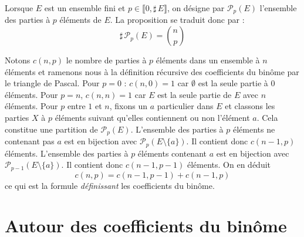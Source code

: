 \begin{rem}
 Lorsque $E$ est un ensemble fini et $p\in\llbracket 0, \sharp\,E\rrbracket$, on désigne par $\mathcal P_p(E)$ l'ensemble des parties à $p$ éléments de $E$. La proposition se traduit donc par :
\begin{displaymath}
 \sharp\,\mathcal P_p(E) = \binom{n}{p}
\end{displaymath}
\end{rem}
\begin{demo}
 Notons $c(n,p)$ le nombre de parties à $p$ éléments dans un ensemble à $n$ éléments et ramenons nous à la définition récursive des coefficients du binôme par le triangle de Pascal.\newline
Pour $p=0$ : $c(n,0)=1$ car $\emptyset$ est la seule partie à $0$ éléments. Pour $p=n$, $c(n,n)=1$ car $E$ est la seule partie de $E$ avec $n$ éléments.\newline
Pour $p$ entre $1$ et $n$, fixons un $a$ particulier dans $E$ et classons les parties $X$ à $p$ éléments suivant qu'elles contiennent ou non l'élément $a$. Cela constitue une partition de $\mathcal P_p(E)$.\newline
L'ensemble des parties à $p$ éléments ne contenant pas $a$ est en bijection avec $\mathcal P_p(E\setminus\{a\})$. Il contient donc $c(n-1,p)$ éléments.\newline
L'ensemble des parties à $p$ éléments contenant $a$ est en bijection avec $\mathcal P_{p-1}(E\setminus\{a\})$. Il contient donc $c(n-1,p-1)$ éléments. On en déduit
\begin{displaymath}
 c(n,p) = c(n-1,p-1) + c(n-1,p)
\end{displaymath}
 ce qui est la formule \emph{définissant} les coefficients du binôme.
\clearpage
\section{Autour des coefficients du binôme}

\end{demo}
